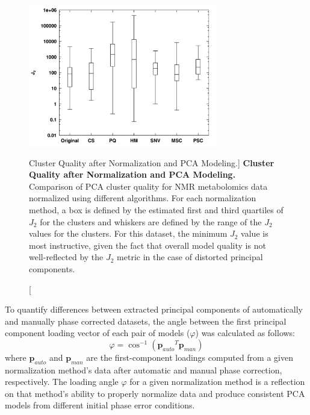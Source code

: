 \begin{figure}
\includegraphics[width=3.25in]{figs/pscorr/02-allj2.png}
\caption
      [Cluster Quality after Normalization and PCA Modeling.]{
  {\bf Cluster Quality after Normalization and PCA Modeling.}
  \\
  Comparison of PCA cluster quality for \hnmr{} NMR metabolomics data
  normalized using different algorithms. For each normalization method, a
  box is defined by the estimated first and third quartiles of $J_2$ for the
  clusters and whiskers are defined by the range of the $J_2$ values for the
  clusters. For this dataset, the minimum $J_2$ value is most instructive,
  given the fact that overall model quality is not well-reflected by the
  $J_2$ metric in the case of distorted principal components.
}
\label{figure.6.2}
\end{figure}

\begin{doublespace}
To quantify differences between extracted principal components of automatically
and manually phase corrected datasets, the angle between the first principal
component loading vector of each pair of models ($\varphi$) was calculated as
follows:
\begin{equation}
\varphi = \cos^{-1}\left( {\mathbf{p}_{auto}}^T \mathbf{p}_{man} \right)
\end{equation}
where $\mathbf{p}_{auto}$ and $\mathbf{p}_{man}$ are the first-component
loadings computed from a given normalization method's data after automatic
and manual phase correction, respectively. The loading angle $\varphi$ for a
given normalization method is a reflection on that method's ability to properly
normalize data and produce consistent PCA models from different initial phase
error conditions.
\end{doublespace}

